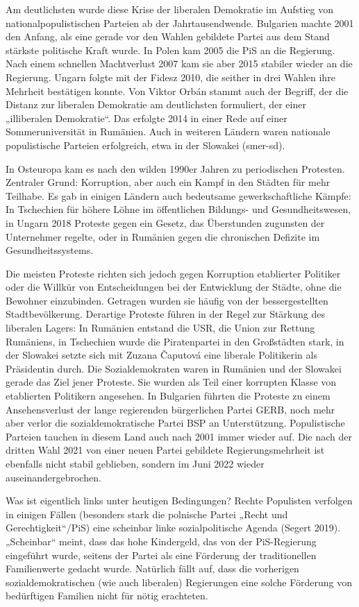 \begin{multicols*}{2}
    Am deutlichsten wurde diese Krise der liberalen Demokratie im Aufstieg von nationalpopulistischen Parteien ab der Jahrtausendwende. Bulgarien machte 2001 den Anfang, als eine gerade vor den Wahlen gebildete Partei aus dem Stand stärkste politische Kraft wurde. In Polen kam 2005 die PiS an die Regierung. Nach einem schnellen Machtverlust 2007 kam sie aber 2015 stabiler wieder an die Regierung. Ungarn folgte mit der Fidesz 2010, die seither in drei Wahlen ihre Mehrheit bestätigen konnte. Von Viktor Orbán stammt auch der Begriff, der die Distanz zur liberalen Demokratie am deutlichsten formuliert, der einer „illiberalen Demokratie“. Das erfolgte 2014 in einer Rede auf einer Sommeruniversität in Rumänien.  Auch in weiteren Ländern waren nationale populistische Parteien erfolgreich, etwa in der Slowakei (smer-sd).

    In Osteuropa kam es nach den wilden 1990er Jahren zu periodischen Protesten. Zentraler Grund: Korruption, aber auch ein Kampf in den Städten für mehr Teilhabe. Es gab in einigen Ländern auch bedeutsame gewerkschaftliche Kämpfe: In Tschechien für höhere Löhne im öffentlichen Bildungs- und Gesundheitswesen, in Ungarn 2018 Proteste gegen ein Gesetz, das Überstunden zugunsten der Unternehmer regelte, oder in Rumänien gegen die chronischen Defizite im Gesundheitssystems. 

    Die meisten Proteste richten sich jedoch gegen Korruption etablierter Politiker oder die Willkür von Entscheidungen bei der Entwicklung der Städte, ohne die Bewohner einzubinden. Getragen wurden sie häufig von der bessergestellten Stadtbevölkerung. Derartige Proteste führen in der Regel zur Stärkung des liberalen Lagers: In Rumänien entstand die USR, die Union zur Rettung Rumäniens, in Tschechien wurde die Piratenpartei in den Großstädten stark, in der Slowakei setzte sich mit Zuzana Čaputová eine liberale Politikerin als Präsidentin durch. Die Sozialdemokraten waren in Rumänien und der Slowakei gerade das Ziel jener Proteste. Sie wurden als Teil einer korrupten Klasse von etablierten Politikern angesehen. In Bulgarien führten die Proteste zu einem Ansehensverlust der lange regierenden bürgerlichen Partei GERB, noch mehr aber verlor die sozialdemokratische Partei BSP an Unterstützung. Populistische Parteien tauchen in diesem Land auch nach 2001 immer wieder auf. Die nach der dritten Wahl 2021 von einer neuen Partei gebildete Regierungsmehrheit ist ebenfalls nicht stabil geblieben, sondern im Juni 2022 wieder auseinandergebrochen. 
    
    Was ist eigentlich links unter heutigen Bedingungen?
    Rechte Populisten verfolgen in einigen Fällen (besonders stark die polnische Partei „Recht und Gerechtigkeit“/PiS) eine scheinbar linke sozialpolitische Agenda (Segert 2019). „Scheinbar“ meint, dass das hohe Kindergeld, das von der PiS-Regierung eingeführt wurde, seitens der Partei als eine Förderung der traditionellen Familienwerte gedacht wurde. Natürlich fällt auf, dass die vorherigen sozialdemokratischen (wie auch liberalen) Regierungen eine solche Förderung von bedürftigen Familien nicht für nötig erachteten. 


\end{multicols*}
